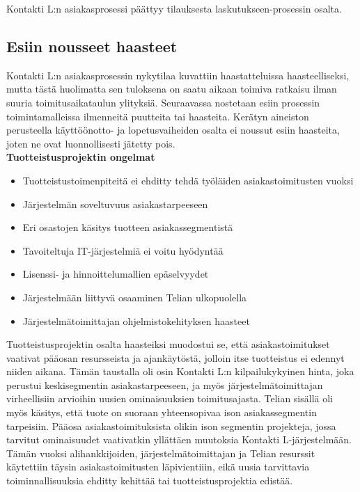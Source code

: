 \documentclass[finnish,12pt,a4paper,pdftex]{article}
\begin{document}
Kontakti L:n asiakasprosessi päättyy tilauksesta laskutukseen-prosessin osalta.

\subsection{Esiin nousseet haasteet}

\noindent Kontakti L:n asiakasprosessin nykytilaa kuvattiin haastatteluissa haasteelliseksi, mutta tästä huolimatta sen tuloksena on saatu aikaan toimiva ratkaisu ilman suuria toimitusaikataulun ylityksiä. Seuraavassa nostetaan esiin prosessin toimintamalleissa ilmenneitä puutteita tai haasteita. Kerätyn aineiston perusteella käyttöönotto- ja lopetusvaiheiden osalta ei noussut esiin haasteita, joten ne ovat luonnollisesti jätetty pois.\\

\textbf{Tuotteistusprojektin ongelmat}\\
\begin{itemize}
    \item Tuotteistustoimenpiteitä ei ehditty tehdä työläiden asiakastoimitusten vuoksi
    \item Järjestelmän soveltuvuus asiakastarpeeseen
    \item Eri osastojen käsitys tuotteen asiakassegmentistä
    \item Tavoiteltuja IT-järjestelmiä ei voitu hyödyntää
    \item Lisenssi- ja hinnoittelumallien epäselvyydet
    \item Järjestelmään liittyvä osaaminen Telian ulkopuolella
    \item Järjestelmätoimittajan ohjelmistokehityksen haasteet
\end{itemize}

Tuotteistusprojektin osalta haasteiksi muodostui se, että asiakastoimitukset vaativat pääosan resursseista ja ajankäytöstä, jolloin itse tuotteistus ei edennyt niiden aikana. Tämän taustalla oli osin Kontakti L:n kilpailukykyinen hinta, joka perustui keskisegmentin asiakastarpeeseen, ja myös järjestelmätoimittajan virheellisiin arvioihin uusien ominaisuuksien toimitusajasta. Telian sisällä oli myös käsitys, että tuote on suoraan yhteensopivaa ison asiakassegmentin tarpeisiin. Pääosa asiakastoimituksista olikin ison segmentin projekteja, jossa tarvitut ominaisuudet vaativatkin yllättäen muutoksia Kontakti L-järjestelmään. Tämän vuoksi alihankkijoiden, järjestelmätoimittajan ja Telian resurssit käytettiin täysin asiakastoimitusten läpivientiiin, eikä uusia tarvittavia toiminnallisuuksia ehditty kehittää tai tuotteistusprojektia edistää.\\
\end{document}

